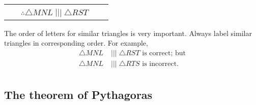 \begin{table}[H]
\begin{center}
\begin{tabular}{|m{3.1cm}|m{4cm}|m{6cm}|}
\begin{center}
\newline
$\frac{MN}{RS} = \frac{ML}{RT} = \frac{NL}{ST}$ \\
 $~~~~~~~\therefore \triangle MNL\;|||\;\triangle RST$ \newline 
 \end{center} \\ \hline 
\end{tabular}
      \end{center}
\end{table}       

The order of letters for similar triangles is very important. Always label similar triangles in corresponding order. For example,
\begin{align*}
  \triangle MNL&\;|||\;\triangle RST \mbox{ is correct; but}\\
  \triangle MNL&\;|||\;\triangle RTS \mbox{ is incorrect.}\\
\end{align*}

\subsection*{The theorem of Pythagoras}
     
